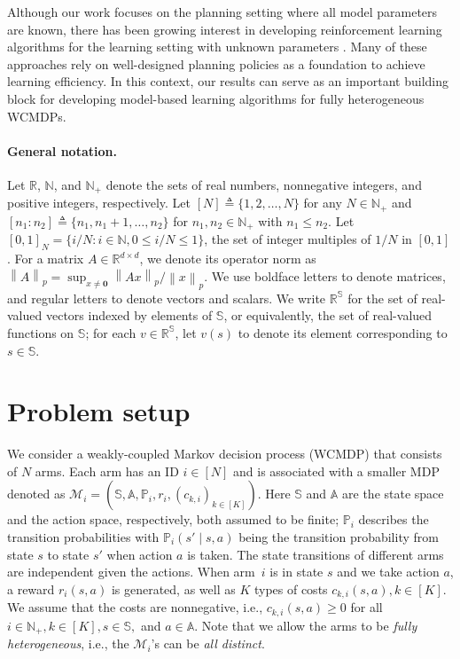 \documentclass{article}
\theoremstyle{plain}
\theoremstyle{remark}
\newcommand{\norm}[1]{\left\lVert#1\right\rVert}
\newcommand{\R}{\mathbb{R}}
\newcommand{\sspa}{\mathbb{S}}
\newcommand{\aspa}{\mathbb{A}}
\newcommand{\RR}{\mathbb{R}}
\newcommand{\cM}{\mathcal{M}}
\newcommand{\PP}{\mathbb{P} }
\begin{document}
Although our work focuses on the planning setting where all model parameters are known, there has been growing interest in developing reinforcement learning algorithms for the learning setting with unknown parameters \citep{biswas21index_healthcare,NakGanHsi_21,killian2021q_multi,NakHou_22,XioWanLi_22,killian2022restless,el2023weakly,robledo2022qwi,XiongLi23,AvrBor_22}.
Many of these approaches rely on well-designed planning policies as a foundation to achieve learning efficiency.
In this context, our results can serve as an important building block for developing model-based learning algorithms for fully heterogeneous WCMDPs.


\paragraph{General notation.}
Let $\mathbb{R}$, $\mathbb{N}$, and $\mathbb{N}_+$ denote the sets of real numbers, nonnegative integers, and positive integers, respectively.
Let $[N]\triangleq\{1,2,\dots,N\}$ for any $N\in \mathbb{N}_+$ and $[n_1:n_2]\triangleq\{n_1,n_1+1,\dots,n_2\}$ for $n_1,n_2\in\mathbb{N}_+$ with $n_1\le n_2$.
Let $[0,1]_N=\{i/N\colon i\in\mathbb{N}, 0\le i/N\le 1\}$, the set of integer multiples of $1/N$ in $[0,1]$.
For a matrix ${A}\in\RR^{d\times d}$, we denote its operator norm as $\norm{{A}}_p=\sup_{x\neq \mathbf{0}} \norm{{A}x}_{p} / \norm{x}_p$. 
We use boldface letters to denote matrices, and regular letters to denote vectors and scalars. We write $\R^{\sspa}$ for the set of real-valued vectors indexed by elements of $\sspa$, or equivalently, the set of real-valued functions on $\sspa$; for each $v\in \R^{\sspa}$, let $v(s)$ to denote its element corresponding to $s\in\sspa$. 




\section{Problem setup}\label{sec:background}
We consider a weakly-coupled Markov decision process (WCMDP) that consists of $N$ arms.
Each arm has an ID $i\in[N]$ and is associated with a smaller MDP denoted as $\cM_i=\left(\sspa, \aspa,\PP_i, r_i, (c_{k,i})_{k\in[K]}\right)$.
Here $\sspa$ and $\aspa$ are the state space and the action space, respectively, both assumed to be finite; $\PP_i$ describes the transition probabilities with $\PP_i(s'\mid s,a)$ being the transition probability from state $s$ to state $s'$ when action $a$ is taken.
The state transitions of different arms are independent given the actions.
When arm~$i$ is in state $s$ and we take action $a$, a reward $r_i(s,a)$ is generated, as well as $K$ types of costs $c_{k,i}(s,a), k\in[K]$. 
We assume that the costs are nonnegative, i.e., $c_{k,i}(s,a)\ge 0$ for all $i\in\mathbb{N}_+,k\in[K],s\in\sspa,$ and $a\in\aspa$.
Note that we allow the arms to be \emph{fully heterogeneous}, i.e., the $\cM_i$'s can be \emph{all distinct}.
\end{document}
